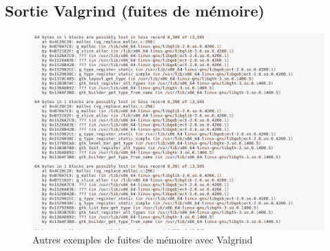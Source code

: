 \documentclass[12pt]{article}
\begin{document}
		\subsection{Sortie Valgrind (fuites de mémoire)}
		\begin{figure}[!h]
		\begin{center}
		\includegraphics[scale=.60]{autres_exemple_fuites_memoire.png}
		\caption{Autres exemples de fuites de mémoire avec Valgrind}
		\label{fig:autres_exemples_fuites_memoire}
		\end{center}
		\end{figure}
 
\end{document}

